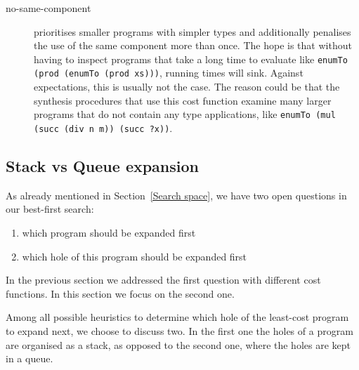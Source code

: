 \begin{description}
\item[no-same-component] prioritises smaller programs with simpler types and additionally penalises the use of the same component more than once. The hope is that without having to inspect programs that take a long time to evaluate like \lstinline?enumTo (prod (enumTo (prod xs)))?, running times will sink. Against expectations, this is usually not the case. The reason could be that the synthesis procedures that use this cost function examine many larger programs that do not contain any type applications, like \lstinline!enumTo (mul (succ (div n m)) (succ ?x))!.
\end{description}

\subsection{Stack vs Queue expansion}\label{Stack vs Queue}
As already mentioned in Section~\ref{Search space}, we have two open questions in our best-first search:
\begin{enumerate}[1.]
\item which program should be expanded first
\item which hole of this program should be expanded first
\end{enumerate}
In the previous section we addressed the first question with different cost functions. In this section we focus on the second one.

Among all possible heuristics to determine which hole of the least-cost program to expand next, we choose to discuss two. In the first one the holes of a program are organised as a stack, as opposed to the second one, where the holes are kept in a queue.

